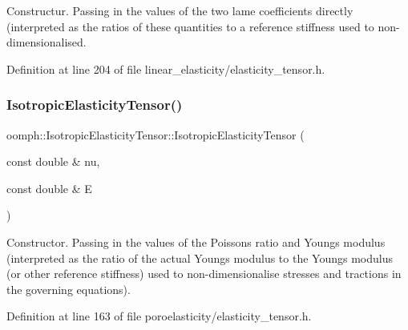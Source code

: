 Constructur. Passing in the values of the two lame coefficients directly (interpreted as the ratios of these quantities to a reference stiffness used to non-\/dimensionalised. 



Definition at line 204 of file linear\+\_\+elasticity/elasticity\+\_\+tensor.\+h.

\mbox{\label{classoomph_1_1IsotropicElasticityTensor_a022f9a6cb2339393a2cbc8eee81717e5}} 
\subsubsection{\texorpdfstring{Isotropic\+Elasticity\+Tensor()}{IsotropicElasticityTensor()}\hspace{0.1cm}{\footnotesize\ttfamily [4/6]}}
{\footnotesize\ttfamily oomph\+::\+Isotropic\+Elasticity\+Tensor\+::\+Isotropic\+Elasticity\+Tensor (\begin{DoxyParamCaption}\item[{const double \&}]{nu,  }\item[{const double \&}]{E }\end{DoxyParamCaption})\hspace{0.3cm}{\ttfamily [inline]}}



Constructor. Passing in the values of the Poisson\textquotesingle{}s ratio and Young\textquotesingle{}s modulus (interpreted as the ratio of the actual Young\textquotesingle{}s modulus to the Young\textquotesingle{}s modulus (or other reference stiffness) used to non-\/dimensionalise stresses and tractions in the governing equations). 



Definition at line 163 of file poroelasticity/elasticity\+\_\+tensor.\+h.

\mbox{\label{classoomph_1_1IsotropicElasticityTensor_a61cc521701ca584ca74477aab86865f6}} 

